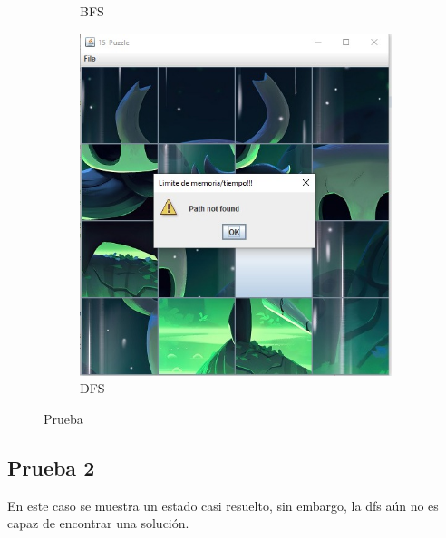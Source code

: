 \begin{figure}[!h]
\begin{subfigure}{0.3\textwidth}
            \caption{BFS}
          \end{subfigure}
          \hfill
          \begin{subfigure}{0.3\textwidth}
            \includegraphics[width=\textwidth]{Imagenes/dfs1.jpg}
            \caption{DFS}
          \end{subfigure}
          \caption{Prueba }
        \end{figure}
        


    
    \subsection{Prueba 2}
        En este caso se muestra un estado casi resuelto, sin embargo, la dfs aún no es capaz de encontrar una solución.

